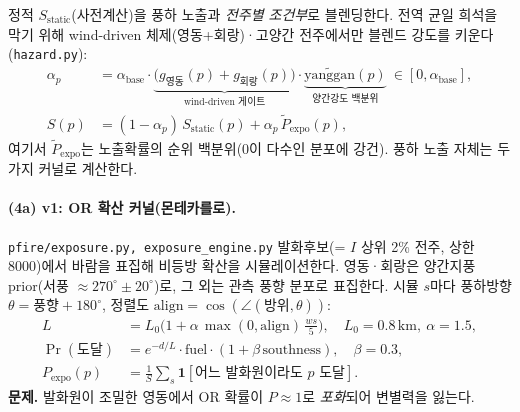 \documentclass[11pt,a4paper]{article}
\newcommand{\src}[1]{{\footnotesize\color{gray}\texttt{#1}}}
\begin{document}
정적 $S_{\text{static}}$(사전계산)을 풍하 노출과 \emph{전주별 조건부}로 블렌딩한다. 전역 균일 희석을
막기 위해 wind-driven 체제(영동+회랑)·고양간 전주에서만 블렌드 강도를 키운다(\src{hazard.py}):
\begin{align}
\alpha_p &= \alpha_{\text{base}}\cdot
\underbrace{\big(g_{\text{영동}}(p)+g_{\text{회랑}}(p)\big)}_{\text{wind-driven 게이트}}\cdot
\underbrace{\widetilde{\mathrm{yanggan}}(p)}_{\text{양간강도 백분위}}\ \in[0,\alpha_{\text{base}}],\\
S(p) &= (1-\alpha_p)\,S_{\text{static}}(p)+\alpha_p\,\widetilde{P}_{\text{expo}}(p),
\label{eq:Sblend}
\end{align}
여기서 $\widetilde{P}_{\text{expo}}$는 노출확률의 순위 백분위(0이 다수인 분포에 강건).
풍하 노출 자체는 두 가지 커널로 계산한다.

\paragraph{(4a) v1: OR 확산 커널(몬테카를로).} \src{pfire/exposure.py, exposure\_engine.py}
발화후보(= $I$ 상위 2\% 전주, 상한 8000)에서 바람을 표집해 비등방 확산을 시뮬레이션한다. 영동·회랑은
양간지풍 prior(서풍 $\approx 270^\circ\!\pm\!20^\circ$)로, 그 외는 관측 풍향 분포로 표집한다. 시뮬
$s$마다 풍하방향 $\theta=\text{풍향}+180^\circ$, 정렬도 $\mathrm{align}=\cos(\angle(\text{방위},\theta))$:
\begin{align}
L &= L_0\big(1+\alpha\,\max(0,\mathrm{align})\,\tfrac{ws}{5}\big),\quad L_0{=}0.8\,\text{km},\ \alpha{=}1.5,\\
\Pr(\text{도달}) &= e^{-d/L}\cdot \mathrm{fuel}\cdot(1+\beta\,\mathrm{southness}),\quad \beta{=}0.3,\\
P_{\text{expo}}(p) &= \tfrac{1}{S}\textstyle\sum_{s}\mathbf{1}[\text{어느 발화원이라도 } p\text{ 도달}].
\label{eq:orexp}
\end{align}
\textbf{문제.} 발화원이 조밀한 영동에서 OR 확률이 $P\approx 1$로 \emph{포화}되어 변별력을 잃는다.
\end{document}
